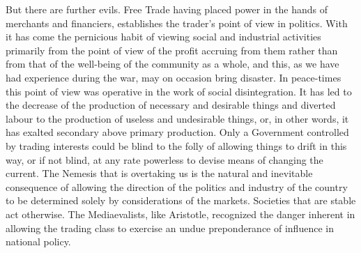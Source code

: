 \documentclass{book}
\begin{document}
But there are further evils. Free Trade having placed power in the hands of merchants and financiers, establishes the trader’s point of view in politics. With it has come the pernicious habit of viewing social and industrial activities primarily from the point of view of the profit accruing from them rather than from that of the well-being of the community as a whole, and this, as we have had experience during the war, may on occasion bring disaster. In peace-times this point of view was operative in the work of social disintegration. It has led to the decrease of the production of necessary and desirable things and diverted labour to the production of useless and undesirable things, or, in other words, it has exalted secondary above primary production. Only a Government controlled by trading interests could be blind to the folly of allowing things to drift in this way, or if not blind, at any rate powerless to devise means of changing the current. The Nemesis that is overtaking us is the natural and inevitable consequence of allowing the direction of the politics and industry of the country to be determined solely by considerations of the markets. Societies that are stable act otherwise. The Mediaevalists, like Aristotle, recognized the danger inherent in allowing the trading class to exercise an undue preponderance of influence in national policy.
\end{document}
